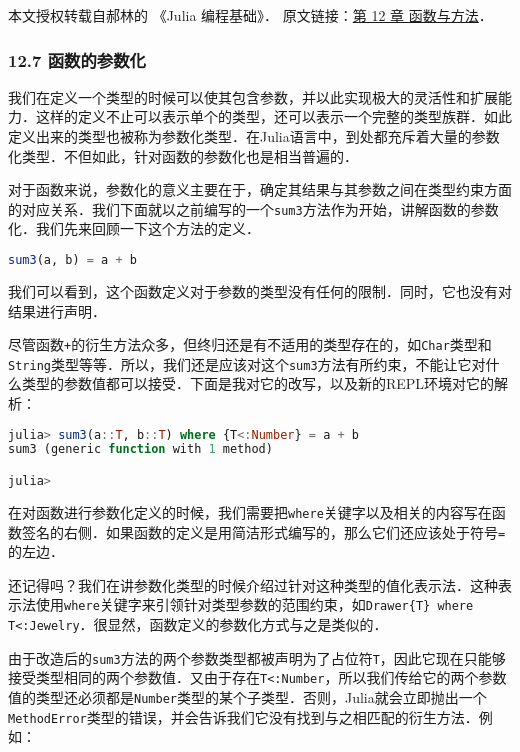 
本文授权转载自郝林的 《Julia 编程基础》． 原文链接：\href{https://github.com/hyper0x/JuliaBasics/blob/master/book/ch12.md}{第 12 章 函数与方法}．


\subsubsection{12.7 函数的参数化}

我们在定义一个类型的时候可以使其包含参数，并以此实现极大的灵活性和扩展能力．这样的定义不止可以表示单个的类型，还可以表示一个完整的类型族群．如此定义出来的类型也被称为参数化类型．在Julia语言中，到处都充斥着大量的参数化类型．不但如此，针对函数的参数化也是相当普遍的．

对于函数来说，参数化的意义主要在于，确定其结果与其参数之间在类型约束方面的对应关系．我们下面就以之前编写的一个\verb|sum3|方法作为开始，讲解函数的参数化．我们先来回顾一下这个方法的定义．

\begin{lstlisting}[language=julia]
sum3(a, b) = a + b
\end{lstlisting}

我们可以看到，这个函数定义对于参数的类型没有任何的限制．同时，它也没有对结果进行声明．

尽管函数\verb|+|的衍生方法众多，但终归还是有不适用的类型存在的，如\verb|Char|类型和\verb|String|类型等等．所以，我们还是应该对这个\verb|sum3|方法有所约束，不能让它对什么类型的参数值都可以接受．下面是我对它的改写，以及新的REPL环境对它的解析：

\begin{lstlisting}[language=julia]
julia> sum3(a::T, b::T) where {T<:Number} = a + b
sum3 (generic function with 1 method)

julia> 
\end{lstlisting}

在对函数进行参数化定义的时候，我们需要把\verb|where|关键字以及相关的内容写在函数签名的右侧．如果函数的定义是用简洁形式编写的，那么它们还应该处于符号\verb|=|的左边．

还记得吗？我们在讲参数化类型的时候介绍过针对这种类型的值化表示法．这种表示法使用\verb|where|关键字来引领针对类型参数的范围约束，如\verb|Drawer{T} where T<:Jewelry|．很显然，函数定义的参数化方式与之是类似的．

由于改造后的\verb|sum3|方法的两个参数类型都被声明为了占位符\verb|T|，因此它现在只能够接受类型相同的两个参数值．又由于存在\verb|T<:Number|，所以我们传给它的两个参数值的类型还必须都是\verb|Number|类型的某个子类型．否则，Julia就会立即抛出一个\verb|MethodError|类型的错误，并会告诉我们它没有找到与之相匹配的衍生方法．例如：

